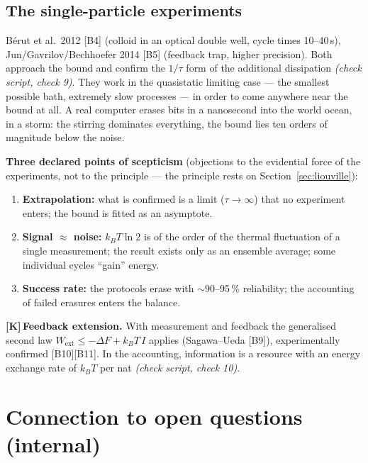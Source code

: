 \documentclass[11pt,a4paper]{article}
\newcommand{\LK}{\textcolor{layK}{\textbf{\footnotesize\textsf{[K]}}}\,}
\newcommand{\pruef}[1]{{\small\itshape(check script, #1)}}
\begin{document}
\subsection{The single-particle experiments}

Bérut et al.\ 2012 [B4] (colloid in an optical double well, cycle times
10--40\,s), Jun/Gavrilov/Bechhoefer 2014 [B5] (feedback trap, higher precision).
Both approach the bound and confirm the $1/\tau$ form of the additional
dissipation \pruef{check 9}. They work in the quasistatic limiting case --- the
smallest possible bath, extremely slow processes --- in order to come anywhere near
the bound at all. A real computer erases bits in a nanosecond into the world ocean,
in a storm: the stirring dominates everything, the bound lies ten orders of
magnitude below the noise.

\textbf{Three declared points of scepticism} (objections to the evidential force
of the experiments, not to the principle --- the principle rests on
Section~\ref{sec:liouville}):

\begin{enumerate}[leftmargin=1.6em,itemsep=0.25em]
  \item \textbf{Extrapolation:} what is confirmed is a limit ($\tau\to\infty$)
        that no experiment enters; the bound is fitted as an asymptote.
  \item \textbf{Signal $\approx$ noise:} $k_B T \ln 2$ is of the order of the
        thermal fluctuation of a single measurement; the result exists only as an
        ensemble average; some individual cycles “gain” energy.
  \item \textbf{Success rate:} the protocols erase with ${\sim}90$--95\,\%
        reliability; the accounting of failed erasures enters the balance.
\end{enumerate}

\LK \textbf{Feedback extension.} With measurement and feedback the generalised
second law $W_{\text{ext}} \le -\Delta F + k_B T\,I$ applies (Sagawa--Ueda [B9]),
experimentally confirmed [B10][B11]. In the accounting, information is a resource
with an energy exchange rate of $k_B T$ per nat \pruef{check 10}.

\section{Connection to open questions (internal)}
\end{document}
